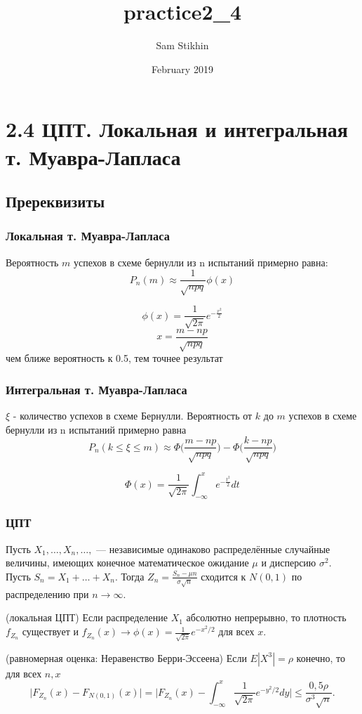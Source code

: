 \documentclass[a4paper, 14pt]{extarticle}
\title{practice2_4}
\author{Sam Stikhin}
\date{February 2019}
\begin{document}
\section*{2.4 ЦПТ. Локальная и интегральная т. Муавра-Лапласа}
\subsection*{Пререквизиты}
\subsubsection*{Локальная т. Муавра-Лапласа} 
Вероятность $m$ успехов в схеме бернулли из n испытаний примерно равна:
$$P_n(m)  \approx \frac{1}{\sqrt{npq}} \phi(x)$$

$$\phi(x) = \frac{1}{\sqrt{2\pi}}e^{-\frac{x^2}{2}}$$
$$x = \frac{m - np}{\sqrt{npq}}$$
чем ближе вероятность к 0.5, тем точнее результат 


\subsubsection*{Интегральная т. Муавра-Лапласа}
$\xi$ - количество успехов в схеме Бернулли. Вероятность от $k$ до $m$ успехов в схеме бернулли из n испытаний примерно равна
$$P_n(k\leq \xi \leq m)  \approx  \Phi\Big(\frac{m-np}{\sqrt{npq}}\Big) - \Phi\Big(\frac{k-np}{\sqrt{npq}}\Big)$$

$$\Phi(x) = \frac{1}{\sqrt{2\pi}}\int_{-\infty}^{x}e^{-\frac{t^2}{2}}dt$$



\subsubsection*{ЦПТ}
Пусть $X_1, \dots , X_n,  \dots ,$  --- независимые одинаково распределённые случайные величины, имеющих конечное математическое ожидание $\mu$ и дисперсию $\sigma^{2}$. Пусть $S_n={X_1+ \dots  +X_n}.$ Тогда $Z_n=\frac{S_n-\mu n}{\sigma\sqrt{n}}$ сходится к $N(0,1)$ по распределению при $n\to\infty.$

(локальная ЦПТ) Если распределение $X_1$ абсолютно непрерывно, то плотность $f_{Z_n}$ существует и $f_{Z_n}(x)\to \phi(x)=\frac{1}{\sqrt{2\pi}}e^{-x^2/2}$ для всех $x.$

(равномерная оценка: Неравенство Берри-Эссеена) Если $E |X^3|=\rho$ конечно, то для всех $n,x$ $$\Big|F_{Z_n}(x)-F_{N(0,1)}(x)\Big|=\bigg|F_{Z_n}(x)-\int_{-\infty}^{x}\frac{1}{\sqrt{2\pi}}e^{-y^2/2}dy\bigg|\leq \frac{0,5 \rho}{\sigma^3 \sqrt{n}}.$$
	
\end{document}
